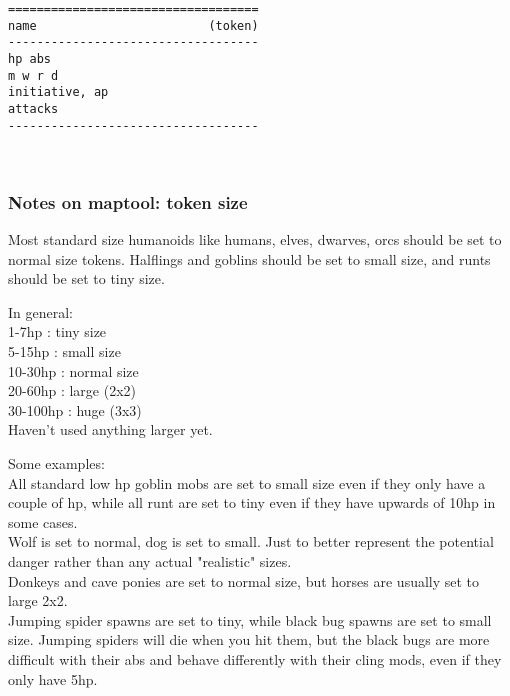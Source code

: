 \goodbreak \begin{samepage} \small \begin{verbatim}
===================================
name                        (token)
-----------------------------------
hp abs
m w r d
initiative, ap
attacks
-----------------------------------
\end{verbatim} \normalsize \end{samepage}

\

\flushbottom




\subsubsection*{Notes on maptool: token size}
Most standard size humanoids like humans, elves, dwarves, orcs should be set to  normal size tokens. Halflings and goblins should be set to small size, and runts should be set to tiny size.

In general:\\
1-7hp : tiny size \\
5-15hp : small size \\
10-30hp : normal size \\
20-60hp : large (2x2) \\
30-100hp : huge (3x3) \\
Haven't used anything larger yet.

Some examples:\\
All standard low hp goblin mobs are set to small size even if they only have a couple of hp, while all runt are set to tiny even if they have upwards of 10hp in some cases.\\
Wolf is set to normal, dog is set to small. Just to better represent the potential danger rather than any actual "realistic" sizes.\\
Donkeys and cave ponies are set to normal size, but horses are usually set to large 2x2.\\
Jumping spider spawns are set to tiny, while black bug spawns are set to small size. Jumping spiders will die when you hit them, but the black bugs are more difficult with their abs and behave differently with their cling mods, even if they only have 5hp.

\






